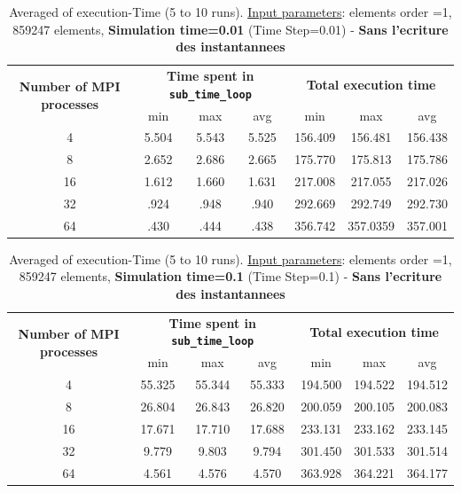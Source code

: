 \documentclass[10pt,twoside]{article}   	%
\begin{document}
\begin{table}[ht!]
\centering
\caption{Averaged of execution-Time (5 to 10 runs). {\underline{Input parameters}}: elements order =1, 859247 elements,  {\bf{Simulation time=0.01}} (Time Step=0.01)  - {\bf{Sans l'ecriture des instantannees}}}
{\small
\begin{tabular}{|c|c|c|c|c|c|c|} \hline 
\multirow{2}{*}{ {{\bf{Number of MPI processes}}} }	& \multicolumn{3}{c|}{ {{\bf{Time spent in \texttt{sub\_time\_loop}  }}} }	& \multicolumn{3}{c|}{  {{\bf{Total execution time}}} }\\ 
										&   		min & max & avg									& 	min & max & avg			\\ \hline \hline
 		4		                 				& 5.504 & 5.543 & 5.525										& 156.409 & 156.481 & 156.438 	\\ \hline
 		8		                 				& 2.652  &  2.686 &  2.665									&   175.770  &  175.813 &  175.786	\\ \hline
 		16		                 				&  1.612 & 1.660  & 1.631 									& 217.008 &  217.055 &  217.026	\\ \hline
		 32		                 				& .924 & .948   & .940										& 292.669  &  292.749 & 292.730	\\ \hline
		64		                 				& .430 & .444  & .438										&  356.742  & 357.0359 &  357.001	\\ \hline
\end{tabular}
}
\label{tab:2}
\end{table}


\begin{table}[ht!]
\centering
\caption{Averaged of execution-Time (5 to 10 runs). {\underline{Input parameters}}: elements order =1, 859247 elements,    {\bf{Simulation time=0.1}} (Time Step=0.1) - {\bf{Sans l'ecriture des instantannees}}}
{\small
\begin{tabular}{|c|c|c|c|c|c|c|} \hline 
\multirow{2}{*}{ {{\bf{Number of MPI processes}}} }	& \multicolumn{3}{c|}{ {{\bf{Time spent in \texttt{sub\_time\_loop}  }}} }	& \multicolumn{3}{c|}{  {{\bf{Total execution time}}} }\\ 
										&   		min & max & avg									& 	min & max & avg			\\ \hline \hline
 		4		                 				& 55.325	& 55.344 & 55.333									&  194.500 & 194.522 & 194.512	\\ \hline
 		8		                 				& 26.804	& 26.843  & 26.820									&  200.059 & 200.105 & 200.083	\\ \hline
 		16		                 				&  17.671	&  17.710 & 17.688									&  233.131 & 233.162 &  233.145	\\ \hline
		 32		                 				& 9.779 & 9.803  & 9.794										&  301.450 & 301.533 & 301.514	\\ \hline
		64		                 				& 4.561 & 4.576  & 4.570										&  363.928 & 364.221 & 364.177	\\ \hline
\end{tabular}
}
\label{tab:3}
\end{table}
\end{document}
